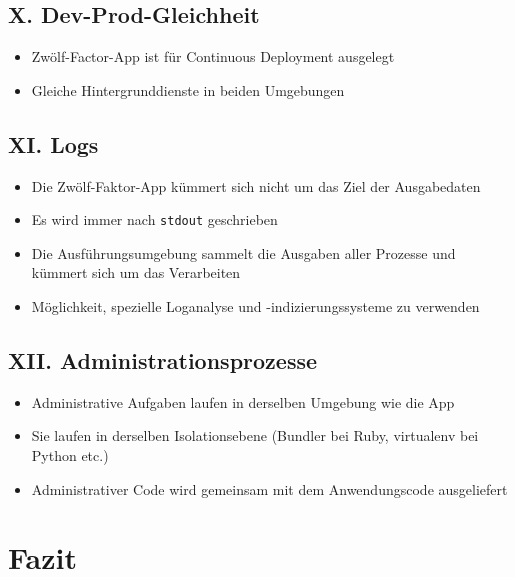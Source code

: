 \documentclass[fleqn,10pt]{SelfArx} %
\begin{document}
\subsection{X. Dev-Prod-Gleichheit}
\begin{itemize}
	\item Zwölf-Factor-App ist für Continuous Deployment ausgelegt
	\item Gleiche Hintergrunddienste in beiden Umgebungen
\end{itemize}
\subsection{XI. Logs}
\begin{itemize}
	\item Die Zwölf-Faktor-App kümmert sich nicht um das Ziel der Ausgabedaten
	\item Es wird immer nach \texttt{stdout} geschrieben
	\item Die Ausführungsumgebung sammelt die Ausgaben aller Prozesse und kümmert sich um das Verarbeiten
	\item Möglichkeit, spezielle Loganalyse und -indizierungssysteme zu verwenden
\end{itemize}
\subsection{XII. Administrationsprozesse}
\begin{itemize}
	\item Administrative Aufgaben laufen in derselben Umgebung wie die App
	\item Sie laufen in derselben Isolationsebene (Bundler bei Ruby, virtualenv bei Python etc.)
	\item Administrativer Code wird gemeinsam mit dem Anwendungscode ausgeliefert
\end{itemize}
\section{Fazit}


\lipsum[4] %






\end{document}
